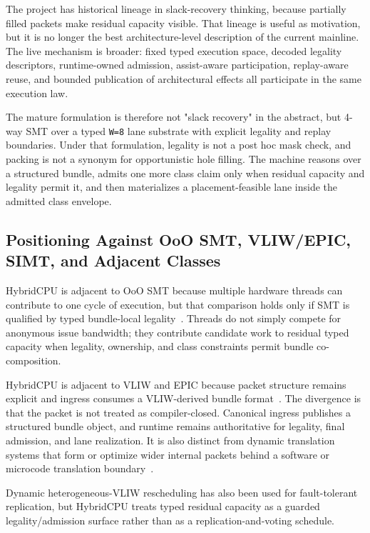 \documentclass[twocolumn]{article}
\begin{document}
The project has historical lineage in slack-recovery thinking, because partially filled packets make residual capacity visible. That lineage is useful as motivation, but it is no longer the best architecture-level description of the current mainline. The live mechanism is broader: fixed typed execution space, decoded legality descriptors, runtime-owned admission, assist-aware participation, replay-aware reuse, and bounded publication of architectural effects all participate in the same execution law.

The mature formulation is therefore not "slack recovery" in the abstract, but 4-way SMT over a typed \texttt{W=8} lane substrate with explicit legality and replay boundaries. Under that formulation, legality is not a post hoc mask check, and packing is not a synonym for opportunistic hole filling. The machine reasons over a structured bundle, admits one more class claim only when residual capacity and legality permit it, and then materializes a placement-feasible lane inside the admitted class envelope.


\subsection{Positioning Against OoO SMT, VLIW/EPIC, SIMT, and Adjacent Classes}

HybridCPU is adjacent to OoO SMT because multiple hardware threads can contribute to one cycle of execution, but that comparison holds only if SMT is qualified by typed bundle-local legality~\cite{tullsen1995smt,kongetira2005niagara,snavely2000symbiotic}. Threads do not simply compete for anonymous issue bandwidth; they contribute candidate work to residual typed capacity when legality, ownership, and class constraints permit bundle co-composition.

HybridCPU is adjacent to VLIW and EPIC because packet structure remains explicit and ingress consumes a VLIW-derived bundle format~\cite{fisher1983vliw,schlansker2000epic,rusu2013poulson}. The divergence is that the packet is not treated as compiler-closed. Canonical ingress publishes a structured bundle object, and runtime remains authoritative for legality, final admission, and lane realization. It is also distinct from dynamic translation systems that form or optimize wider internal packets behind a software or microcode translation boundary~\cite{dehnert2003transmeta,boggs2015denver}.

Dynamic heterogeneous-VLIW rescheduling has also been used for
fault-tolerant replication, but HybridCPU treats typed residual
capacity as a guarded legality/admission surface rather than as
a replication-and-voting schedule.
\end{document}
